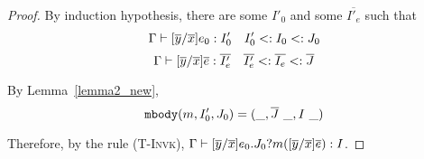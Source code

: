 \begin{lemma}
\begin{proof}
By induction hypothesis, there are some $I'_0$ and some $\overline{I'_e}$ such that
	$$\Gamma \; {\vdash} \; [\overline{y}/\overline{x}]e_0 : I_0' \quad I_0' <: I_0 <: J_0$$
	$$\Gamma \; {\vdash} \; [\overline{y}/\overline{x}]\overline{e} : \overline{I_e'} \quad 
	  \overline{I_e'} <: \overline{I_e} <: \overline{J}$$   

By Lemma~\ref{lemma2_new},
	$$\mbody(m, I'_0, J_0) = (\_, \overline{J}\ \_, I\ \_)$$
	
Therefore, by the rule \textsc{(T-Invk)}, 
	$\Gamma \; {\vdash} \; [\overline{y}/\overline{x}]e_0.J_0?m([\overline{y}/\overline{x}]\overline{e}) : I$.



\end{proof}

\end{lemma}



